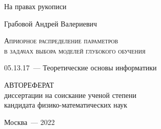 \documentclass{dissert}
\begin{document}
\begin{titlepage}
\begin{flushright}
{На правах рукописи}
\end{flushright}
\vspace{1.5cm}
\begin{center}
{Грабовой Андрей Валериевич}
\par
\vspace{2cm}
\textsc{Априорное распределение параметров \\в задачах выбора моделей глубокого обучения}
\par
\vspace{2cm}
{05.13.17~--- Теоретические основы информатики}
\par
\vspace{2cm}
{АВТОРЕФЕРАТ\\
диссертации на соискание ученой степени\\
кандидата физико-математических наук}
\end{center}
\par
\vspace{3.5cm}
\begin{center}
{Москва~--- 2022}
\end{center}
\end{titlepage}
\end{document}

